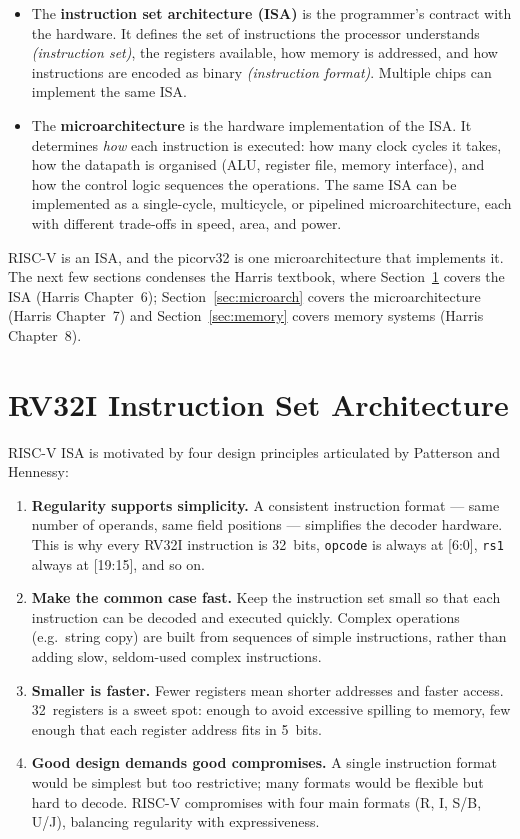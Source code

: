 \documentclass[9pt, a4paper]{extarticle}
\begin{document}
\begin{itemize}
    \item The \textbf{instruction set architecture (ISA)} is the programmer's contract with the hardware. It defines the set of instructions the processor understands \textit{(instruction set)}, the registers available, how memory is addressed, and how instructions are encoded as binary \textit{(instruction format)}. Multiple chips can implement the same ISA.

    \item The \textbf{microarchitecture} is the hardware implementation of the ISA. It determines \emph{how} each instruction is executed: how many clock cycles it takes, how the datapath is organised (ALU, register file, memory interface), and how the control logic sequences the operations. The same ISA can be implemented as a single-cycle, multicycle, or pipelined microarchitecture, each with different trade-offs in speed, area, and power.
\end{itemize}

RISC-V is an ISA, and the picorv32 is one microarchitecture that implements it. The next few sections condenses the Harris \cite{harris2022} textbook, where Section~\ref{sec:isa} covers the ISA (Harris Chapter~6); Section~\ref{sec:microarch} covers the microarchitecture (Harris Chapter~7) and Section~\ref{sec:memory} covers memory systems (Harris Chapter~8).

\section{RV32I Instruction Set Architecture}
\label{sec:isa}

 RISC-V ISA is motivated by four design principles articulated by Patterson and Hennessy:

\begin{enumerate}
    \item \textbf{Regularity supports simplicity.} A consistent instruction format --- same number of operands, same field positions --- simplifies the decoder hardware. This is why every RV32I instruction is 32~bits, \texttt{opcode} is always at [6:0], \texttt{rs1} always at [19:15], and so on.
    \item \textbf{Make the common case fast.} Keep the instruction set small so that each instruction can be decoded and executed quickly. Complex operations (e.g.\ string copy) are built from sequences of simple instructions, rather than adding slow, seldom-used complex instructions.
    \item \textbf{Smaller is faster.} Fewer registers mean shorter addresses and faster access. 32~registers is a sweet spot: enough to avoid excessive spilling to memory, few enough that each register address fits in 5~bits.
    \item \textbf{Good design demands good compromises.} A single instruction format would be simplest but too restrictive; many formats would be flexible but hard to decode. RISC-V compromises with four main formats (R, I, S/B, U/J), balancing regularity with expressiveness.
\end{enumerate}
\end{document}
